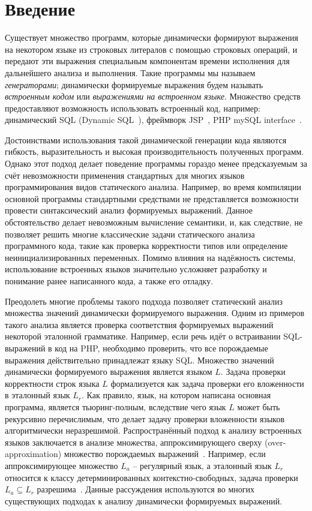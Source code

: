 \section*{Введение}
Существует множество программ, которые динамически формируют выражения на  некотором языке из строковых литералов с помощью строковых операций, и передают эти выражения специальным компонентам времени исполнения для дальнейшего анализа и выполнения. Такие программы мы называем \emph{генераторами}; динамически формируемые выражения будем называть \emph{встроенным кодом} или \emph{выражениями на встроенном языке}. Множество средств предоставляют возможность использовать встроенный код, например: динамический SQL (Dynamic SQL~\cite{DSQLISO}), фреймворк JSP~\cite{JSP}, PHP mySQL interface~\cite{PHPmySQL}. 

Достоинствами использования такой динамической генерации кода являются гибкость, выразительность и высокая производительность полученных программ. Однако этот подход делает поведение программы гораздо менее предсказуемым за счёт невозможности применения стандартных для многих языков программирования видов статического анализа. Например, во время компиляции основной программы стандартными средствами не представляется возможности провести синтаксический анализ формируемых выражений. Данное обстоятельство делает невозможным вычисление семантики, и, как следствие, не позволяет решить многие классические задачи статического анализа программного кода, такие как проверка корректности типов или определение неинициализированных переменных. Помимо влияния на надёжность системы, использование встроенных языков значительно усложняет разработку и понимание ранее написанного кода, а также его отладку. 

Преодолеть многие проблемы такого подхода позволяет статический анализ множества значений динамически формируемого выражения. Одним из примеров такого анализа  является проверка соответствия формируемых выражений некоторой эталонной  грамматике. Например, если речь идёт о встраивании SQL-выражений в код на PHP,  необходимо проверить, что все порождаемые выражения действительно принадлежат  языку SQL. Множество значений динамически формируемого выражения является  языком $L$. Задача проверки корректности строк языка $L$ формализуется как задача проверки его вложенности в эталонный язык $L_{r}$. Как правило, язык, на котором написана основная программа, является тьюринг-полным, вследствие чего язык $L$ может быть рекурсивно перечислимым, что делает задачу проверки вложенности языков алгоритмически неразрешимой. Распространённый подход к анализу встроенных языков заключается в анализе множества, аппроксимирующего сверху (over-approximation) множество порождаемых выражений~\cite{Stranger,JSA,Alvor,Alvor2}. Например, если аппроксимирующее множество $L_{a}$ -- регулярный язык, а эталонный язык $L_{r}$ относится к классу детерминированных контекстно-свободных, задача проверки $L_{a} \subseteq L_{r}$ разрешима~\cite{LangInclusion}. Данные рассуждения используются во многих существующих подходах к анализу динамически формируемых выражений. 

